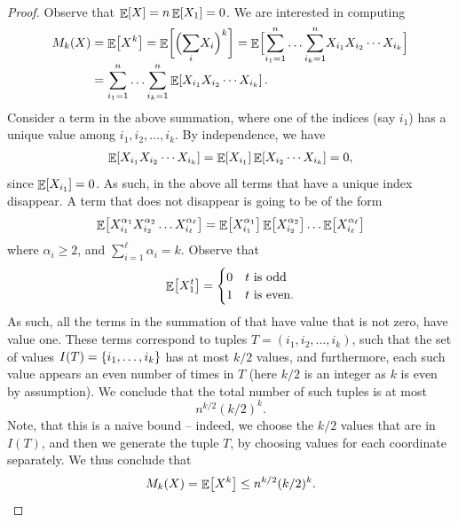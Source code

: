 \begin{proof}    
    Observe that $\mathop{\mathbb{E}}\!\left[ {X} \right] = n \mathop{\mathbb{E}}\!\left[ {X_1} \right] = 0$.  We are interested in
    computing
    \begin{align*}
        M_k(X)%
        &=%
        \Ex{  X^{k}}%
        =%
        \Ex{  \Bigl(\smash{\sum_i} X_i \Bigr)^{k}}%
        =%
        \Ex{\Bigl. \smash{\sum_{i_1=1}^n}  \ldots \smash{\sum_{i_k=1}^n}  X_{i_1} X_{i_2} \cdots
           X_{i_k} }%
        \\&
        =%
        \sum_{i_1=1}^n  \ldots \sum_{i_k=1}^n
        \Ex{X_{i_1} X_{i_2} \cdots
           X_{i_k} }.
        \eqlab{m:k}
    \end{align*}
    Consider a term in the above summation, where one of the indices
    (say $i_1$) has a unique value among $i_1, i_2, \ldots, i_k$. By
    independence, we have
    \begin{align*}
      \mathop{\mathbb{E}}\!\left[ {X_{i_1} X_{i_2} \cdots X_{i_k} } \right]
      = 
      \mathop{\mathbb{E}}\!\left[ {X_{i_1}} \right]\mathop{\mathbb{E}}\!\left[ { X_{i_2} \cdots X_{i_k} } \right] = 0,
    \end{align*}
    since $\mathop{\mathbb{E}}\!\left[ {X_{i_1}} \right] = 0$.  As such, in the above all terms that
    have a unique index disappear. A term that does not disappear is
    going to be of the form
    \begin{equation*}
        \Ex{X_{i_1}^{\alpha_1} X_{i_2}^{\alpha_2} \ldots
           X_{i_\ell}^{\alpha_\ell}}
        =%
        \Ex{X_{i_1}^{\alpha_1}}\Ex{ X_{i_2}^{\alpha_2}} \ldots
        \Ex{ X_{i_\ell}^{\alpha_\ell}}
    \end{equation*}
    where $\alpha_i \geq 2$, and $\sum_{i=1}^\ell \alpha_i = k$. Observe that
    \[
        \mathop{\mathbb{E}}\!\left[ {X_1^t} \right] =\begin{cases}
            0 & t \text{ is odd}\\
            1 & t \text{ is even.}
        \end{cases}
    \]
    As such, all the terms in the summation of  that have
    value that is not zero, have value one. These terms correspond to
    tuples $T = (i_1, i_2, \ldots, i_k)$, such that the set of values
    $I(T) = \left\{ { i_1, \ldots, i_k} \right\}$ has at most $k/2$ values, and
    furthermore, each such value appears an even number of times in
    $T$ (here $k/2$ is an integer as $k$ is even by assumption). We
    conclude that the total number of such tuples is at most
    \[
        n^{k/2} (k/2)^k.
    \]
    Note, that this is a naive bound -- indeed, we choose the $k/2$
    values that are in $I(T)$, and then we generate the tuple $T$, by
    choosing values for each coordinate separately. We thus conclude
    that
    \begin{equation*}
        M_k(X) = \Ex{  X^{k}}%
        \leq n^{k/2} (k/2)^k.
    \end{equation*}


\end{proof}
